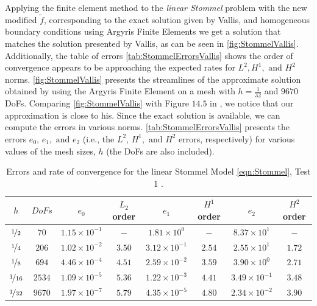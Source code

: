 Applying the finite element method to the \emph{linear Stommel} problem with the
new modified $\tilde{f}$, corresponding to the exact solution given by Vallis,
and homogeneous boundary conditions using Argyris Finite Elements we get a
solution that matches the solution presented by Vallis, as can be seen in
\autoref{fig:StommelVallis}. Additionally, the table of errors
\autoref{tab:StommelErrorsVallis} shows the order of convergence appears to be
approaching the expected rates for $L^2, H^1, \text{ and } H^2$ norms.
\autoref{fig:StommelVallis} presents the streamlines of the approximate solution
obtained by using the Argyris Finite Element on a mesh with $h=\frac{1}{32}$ and
$9670$ DoFs. Comparing \autoref{fig:StommelVallis} with Figure $14.5$ in
\cite{Vallis06}, we notice that our approximation is close to his. Since the
exact solution is available, we can compute the errors in various norms.
\autoref{tab:StommelErrorsVallis} presents the errors $e_0,\, e_1, \text{ and }
e_2$ (i.e., the $L^2,\, H^1, \text{ and } H^2$ errors, respectively) for various
values of the mesh sizes, $h$ (the DoFs are also included).

\begin{table}%
\begin{center}
\begin{tabular}{|c|c|c|c|c|c|c|c|}%
  \hline
  $h$ & $DoFs$ & $e_0$ & $L_2$ order & $e_1$ & $H^1$ order & $e_2$ & $H^2$ order \\[0.2em] %
  \hline
  $\nicefrac{1}{2}$ & $70$ & $1.15\times 10^{-1}$ & $-$ & $1.81\times 10^0$ & $-$ & $8.37\times 10^1$ & $-$ \\[0.2em] %
  $\nicefrac{1}{4}$ & $206$ & $1.02\times 10^{-2}$ & $3.50$ & $3.12\times 10^{-1}$ & $2.54$ & $2.55\times 10^1$ & $1.72$ \\[0.2em] %
  $\nicefrac{1}{8}$ & $694$ & $4.46\times 10^{-4}$ & $4.51$ & $2.59\times 10^{-2}$ & $3.59$ & $3.90\times 10^0$ & $2.71$ \\[0.2em] %
  $\nicefrac{1}{16}$ & $2534$ & $1.09\times 10^{-5}$ & $5.36$ & $1.22\times 10^{-3}$ & $4.41$ & $3.49\times 10^{-1}$ & $3.48$ \\[0.2em] %
  $\nicefrac{1}{32}$ & $9670$ & $1.97\times 10^{-7}$ & $5.79$ & $4.35\times 10^{-5}$ & $4.80$ & $2.34\times 10^{-2}$ & $3.90$ \\[0.2em] %
  \hline
\end{tabular}
\end{center}
\caption{Errors and rate of convergence for the linear Stommel Model
  \eqref{eqn:Stommel}, Test 1 \cite{Vallis06}.}
\label{tab:StommelErrorsVallis}
\end{table}

